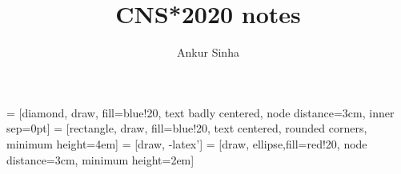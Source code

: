 \usepackage{minted}

\makeatletter
\pretocmd\@wrindex%
  {}
  {}{}
\makeatother

\newtheorem*{definition}{Definition}

 = [diamond, draw, fill=blue!20,
    text badly centered, node distance=3cm, inner sep=0pt]
 = [rectangle, draw, fill=blue!20,
    text centered, rounded corners, minimum height=4em]
 = [draw, -latex']
 = [draw, ellipse,fill=red!20, node distance=3cm,
    minimum height=2em]


\makeatletter
\newcommand\appendtographicspath[1]{%
  \g@addto@macro\Ginput@path{#1}%
}
\makeatother


\usepackage{csquotes}

\usepackage[capitalise,noabbrev]{cleveref}


\title{CNS*2020 notes}
\author{Ankur Sinha}
